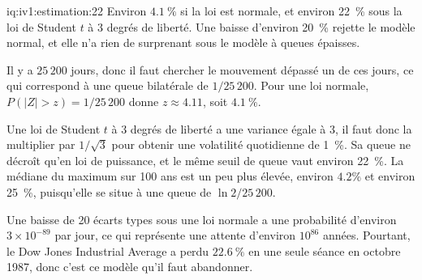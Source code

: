 \begin{solution}{iq:iv1:estimation:22}
Environ $4.1~\%$ si la loi est normale, et environ 22~\% sous la loi de Student $t$ à 3 degrés de liberté. Une baisse d'environ 20~\% rejette le modèle normal, et elle n'a rien de surprenant sous le modèle à queues épaisses.

Il y a $25\,200$ jours, donc il faut chercher le mouvement dépassé un de ces jours, ce qui correspond à une queue bilatérale de $1/25\,200$. Pour une loi normale, $P(|Z| > z) = 1/25\,200$ donne $z \approx 4.11$, soit $4.1~\%$.

Une loi de Student $t$ à 3 degrés de liberté a une variance égale à 3, il faut donc la multiplier par $1/\sqrt{3}$ pour obtenir une volatilité quotidienne de 1~\%. Sa queue ne décroît qu'en loi de puissance, et le même seuil de queue vaut environ 22~\%. La médiane du maximum sur 100 ans est un peu plus élevée, environ $4.2\%$ et environ 25~\%, puisqu'elle se situe à une queue de $\ln 2/25\,200$.

Une baisse de 20 écarts types sous une loi normale a une probabilité d'environ $3 \times 10^{-89}$ par jour, ce qui représente une attente d'environ $10^{86}$ années. Pourtant, le Dow Jones Industrial Average a perdu $22.6~\%$ en une seule séance en octobre 1987, donc c'est ce modèle qu'il faut abandonner.

\end{solution}

